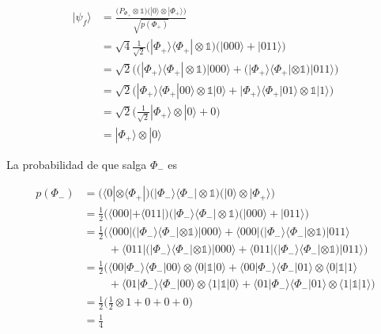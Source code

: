 \documentclass{article}
\begin{document}
\begin{align*}
  |\psi_f\rangle &= \frac
    {\Big(P_{\Phi_+} \otimes \mathbb{1}\Big)
    \Big(|0\rangle\otimes|\Phi_+\rangle\Big)}
    {\sqrt{p(\Phi_+)}} \\ 
  &= \sqrt{4}\frac{1}{\sqrt{2}}
    \Big(|\Phi_+\rangle\langle \Phi_+| \otimes \mathbb{1}\Big)
    \Big(|000\rangle + |011\rangle\Big) \\
  &= \sqrt{2}\Big(
  \big(|\Phi_+\rangle\langle \Phi_+| \otimes \mathbb{1}\big)|000
    \rangle +
  \big(|\Phi_+\rangle\langle \Phi_+| \otimes \mathbb{1}\big)|011
    \rangle
  \Big) \\ 
  &= \sqrt{2}\Big(
  |\Phi_+\rangle\langle \Phi_+|00\rangle \otimes 
    \mathbb{1}|0\rangle +
  |\Phi_+\rangle\langle \Phi_+|01\rangle \otimes 
    \mathbb{1}|1\rangle
  \Big) \\ 
  &= \sqrt{2}\Big(
    \frac{1}{\sqrt{2}}|\Phi_+\rangle \otimes |0 \rangle + 0
  \Big) \\ 
  &= |\Phi_+\rangle \otimes |0 \rangle
\end{align*}

La probabilidad de que salga $\Phi_-$ es

\begin{align*}
  p(\Phi_-) 
    &= \Big(\langle 0| \otimes \langle \Phi_+|\Big)
       \Big(|\Phi_-\rangle\langle\Phi_-|\otimes \mathbb{1}\Big)  
       \Big(|0\rangle \otimes |\Phi_+\rangle\Big) \\
    &= \frac{1}{2}
    \Big(\langle 000| + \langle 011|\Big)
    \Big(|\Phi_-\rangle\langle \Phi_-| \otimes \mathbb{1}\Big)
    \Big(|000\rangle + |011\rangle\Big) \\
    &= \frac{1}{2}
      \Big(\langle 000|
        \big(|\Phi_- \rangle\langle \Phi_-|\otimes \mathbb{1}\big)
      |000\rangle +
      \langle 000|
        \big(|\Phi_- \rangle\langle \Phi_-|\otimes \mathbb{1}\big)
      |011\rangle \\ &\;\;\;\;\;\;\;\;+
      \langle 011|
        \big(|\Phi_- \rangle\langle \Phi_-|\otimes \mathbb{1}\big)
      |000\rangle +
      \langle 011|
        \big(|\Phi_- \rangle\langle \Phi_-|\otimes \mathbb{1}\big)
      |011\rangle
    \Big) \\
    &= \frac{1}{2}\Big(
      \langle 00|\Phi_- \rangle\langle \Phi_-|00\rangle
      \otimes 
      \langle 0|\mathbb{1}|0\rangle +
      \langle 00|\Phi_- \rangle\langle \Phi_-|01\rangle
      \otimes 
      \langle 0|\mathbb{1}|1\rangle \\ &\;\;\;\;\;\;\;\;+
      \langle 01|\Phi_- \rangle\langle \Phi_-|00\rangle
      \otimes 
      \langle 1|\mathbb{1}|0\rangle +
      \langle 01|\Phi_- \rangle\langle \Phi_-|01\rangle
      \otimes 
      \langle 1|\mathbb{1}|1\rangle
      \Big) \\ 
   &= \frac{1}{2}\Big(
      \frac{1}{2} \otimes 1 + 0 + 0 + 0
      \Big) \\ 
   &= \frac{1}{4} 
\end{align*}
\end{document}
